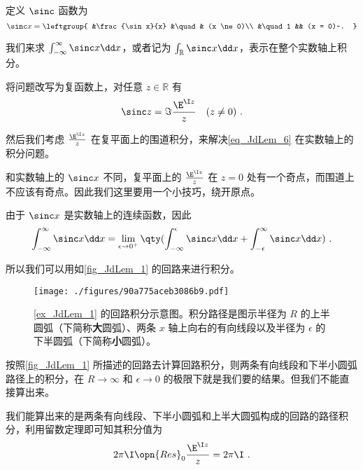 \begin{example}{}\label{ex_JdLem_1}

定义 $\sinc$ 函数为
\begin{equation}
\sinc x = 
\leftgroup{
&\frac{\sin x}{x} &\quad & (x \ne 0)\\
&\quad 1 && (x = 0)~.
}\end{equation}

我们来求 $\int_{-\infty}^{\infty}\sinc x\dd x$，或者记为 $\int_{\mathbb{R}}\sinc x \dd x$，表示在整个实数轴上积分。

将问题改写为复函数上，对任意 $z\in\mathbb{R}$ 有
\begin{equation}\label{eq_JdLem_6}
\sinc z = \Im \frac{\E^{\I z}}{z} \quad  (z \ne 0)~.
\end{equation}

然后我们考虑 $\frac{\E^{\I z}}{z}$ 在复平面上的围道积分，来解决\autoref{eq_JdLem_6} 在实数轴上的积分问题。

和实数轴上的 $\sinc x$ 不同，复平面上的 $\frac{\E^{\I z}}{z}$ 在 $z=0$ 处有一个奇点，而围道上不应该有奇点。因此我们这里要用一个小技巧，绕开原点。

由于 $\sinc x$ 是实数轴上的连续函数，因此
\begin{equation}
\int_{-\infty}^\infty \sinc x \dd x=\lim\limits_{\epsilon\to 0^+}\qty(\int_{-\infty}^\epsilon \sinc x \dd x+\int_{-\epsilon}^\infty \sinc x \dd x)~.
\end{equation}

所以我们可以用如\autoref{fig_JdLem_1} 的回路来进行积分。

\begin{figure}[ht]
\centering
\texttt{[image: ./figures/90a775aceb3086b9.pdf]}
\caption{\autoref{ex_JdLem_1} 的回路积分示意图。积分路径是图示半径为 $R$ 的上半圆弧（下简称\textbf{大}圆弧）、两条 $x$ 轴上向右的有向线段以及半径为 $\epsilon$ 的下半圆弧（下简称\textbf{小}圆弧）。} \label{fig_JdLem_1}
\end{figure}

按照\autoref{fig_JdLem_1} 所描述的回路去计算回路积分，则两条有向线段和下半小圆弧路径上的积分，在 $R\to\infty$ 和 $\epsilon\to 0$ 的极限下就是我们要的结果。但我们不能直接算出来。

我们能算出来的是两条有向线段、下半小圆弧和上半大圆弧构成的回路的路径积分，利用留数定理即可知其积分值为
\begin{equation}\label{eq_JdLem_7}
2\pi\I\opn{Res}_0\frac{\E^{\I z}}{z}=2\pi\I~.
\end{equation}


\end{example}
